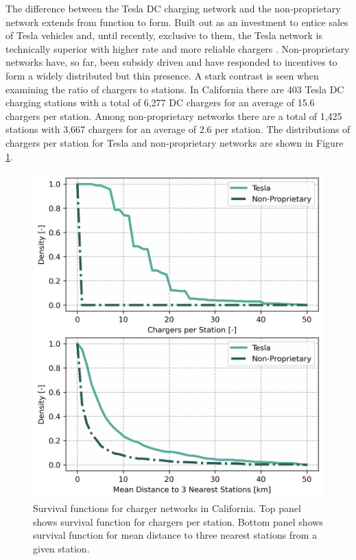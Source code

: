 \documentclass[11pt]{article}
\begin{document}
\begin{multicols}{2}
The difference between the Tesla DC charging network and the non-proprietary network extends from function to form. Built out as an investment to entice sales of Tesla vehicles and, until recently, exclusive to them, the Tesla network is technically superior with higher rate and more reliable chargers \cite{Rempel_2023, Kozumplik_2022}. Non-proprietary networks have, so far, been subsidy driven \cite{Gamage_2023} and have responded to incentives to form a widely distributed but thin presence. A stark contrast is seen when examining the ratio of chargers to stations. In California there are 403 Tesla DC charging stations with a total of 6,277 DC chargers for an average of 15.6 chargers per station. Among non-proprietary networks there are a total of 1,425 stations with 3,667 chargers for an average of 2.6 per station. The distributions of chargers per station for Tesla and non-proprietary networks are shown in Figure \ref{fig:network_histograms}.

\begin{figure}[H]
	\centering
	\includegraphics[width = \linewidth]{figs/California_Charger_Network_Survival_Functions.png}
	\caption{Survival functions for charger networks in California. Top panel shows survival function for chargers per station. Bottom panel shows survival function for mean distance to three nearest stations from a given station.}
	\label{fig:network_histograms}
\end{figure}


\end{multicols}
\end{document}

